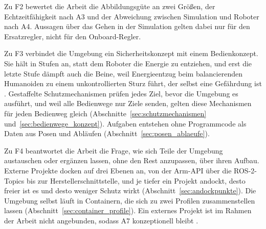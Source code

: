 Zu F2 bewertet die Arbeit die Abbildungsgüte an zwei Größen, der Echtzeitfähigkeit nach A3 und der Abweichung zwischen Simulation und Roboter nach A4.
Aussagen über das Gehen in der Simulation gelten dabei nur für den Ersatzregler, nicht für den Onboard-Regler.

Zu F3 verbindet die Umgebung ein Sicherheitskonzept mit einem Bedienkonzept.
Sie hält in Stufen an, statt dem Roboter die Energie zu entziehen, und erst die letzte Stufe dämpft auch die Beine, weil Energieentzug beim balancierenden Humanoiden zu einem unkontrollierten Sturz führt, der selbst eine Gefährdung ist \cite{Ding2026}.
Gestaffelte Schutzmechanismen prüfen jedes Ziel, bevor die Umgebung es ausführt, und weil alle Bedienwege nur Ziele senden, gelten diese Mechanismen für jeden Bedienweg gleich (Abschnitte~\ref{sec:schutzmechanismen} und~\ref{sec:bedienwege_konzept}).
Aufgaben entstehen ohne Programmcode als Daten aus Posen und Abläufen (Abschnitt~\ref{sec:posen_ablaeufe}).

Zu F4 beantwortet die Arbeit die Frage, wie sich Teile der Umgebung austauschen oder ergänzen lassen, ohne den Rest anzupassen, über ihren Aufbau.
Externe Projekte docken auf drei Ebenen an, von der Arm-API über die ROS-2-Topics bis zur Herstellerschnittstelle, und je tiefer ein Projekt andockt, desto freier ist es und desto weniger Schutz wirkt (Abschnitt~\ref{sec:andockpunkte}).
Die Umgebung selbst läuft in Containern, die sich zu zwei Profilen zusammenstellen lassen (Abschnitt~\ref{sec:container_profile}).
Ein externes Projekt ist im Rahmen der Arbeit nicht angebunden, sodass A7 konzeptionell bleibt .

